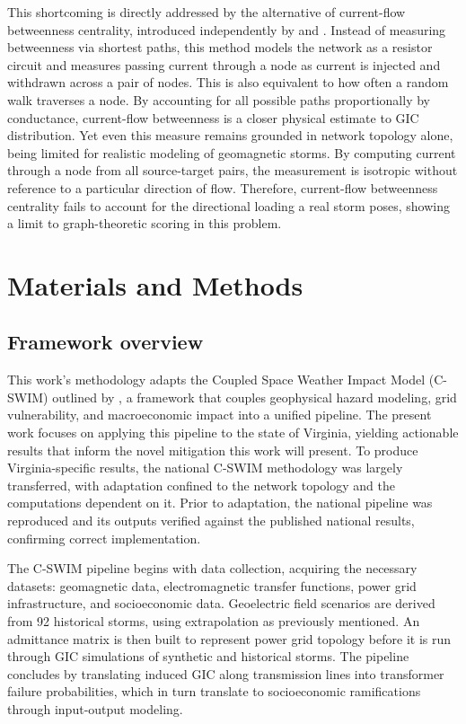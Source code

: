 \documentclass[draft]{agujournal2019}
\begin{document}
This shortcoming is directly addressed by the alternative of current-flow betweenness centrality, introduced independently by  and . Instead of measuring betweenness via shortest paths, this method models the network as a resistor circuit and measures passing current through a node as current is injected and withdrawn across a pair of nodes. This is also equivalent to how often a random walk traverses a node. By accounting for all possible paths proportionally by conductance, current-flow betweenness is a closer physical estimate to GIC distribution. Yet even this measure remains grounded in network topology alone, being limited for realistic modeling of geomagnetic storms. By computing current through a node from all source-target pairs, the measurement is isotropic without reference to a particular direction of flow. Therefore, current-flow betweenness centrality fails to account for the directional loading a real storm poses, showing a limit to graph-theoretic scoring in this problem.

\clearpage

\section{Materials and Methods}

\subsection{Framework overview}

This work's methodology adapts the Coupled Space Weather Impact Model (C-SWIM) outlined by , a framework that couples geophysical hazard modeling, grid vulnerability, and macroeconomic impact into a unified pipeline. The present work focuses on applying this pipeline to the state of Virginia, yielding actionable results that inform the novel mitigation this work will present. To produce Virginia-specific results, the national C-SWIM methodology was largely transferred, with adaptation confined to the network topology and the computations dependent on it. Prior to adaptation, the national pipeline was reproduced and its outputs verified against the published national results, confirming correct implementation.

The C-SWIM pipeline begins with data collection, acquiring the necessary datasets: geomagnetic data, electromagnetic transfer functions, power grid infrastructure,  and socioeconomic data. Geoelectric field scenarios are derived from 92 historical storms, using extrapolation as previously mentioned. An admittance matrix is then built to represent power grid topology before it is run through GIC simulations of synthetic and historical storms.  The pipeline concludes by translating induced GIC along transmission lines into transformer failure probabilities, which in turn translate to socioeconomic ramifications through input-output modeling. 
\end{document}
